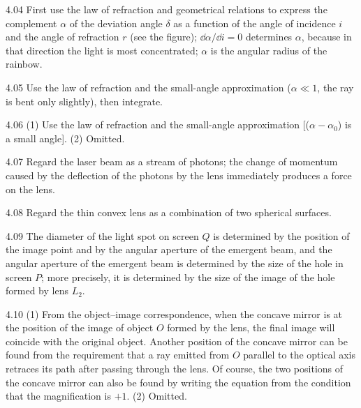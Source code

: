 \begin{hint}{4.04}
First use the law of refraction and geometrical relations to express the complement $\alpha$ of the deviation angle $\delta$ as a function of the angle of incidence $i$ and the angle of refraction $r$ (see the figure); $\dd\alpha/\dd i=0$ determines $\alpha$, because in that direction the light is most concentrated; $\alpha$ is the angular radius of the rainbow.
\end{hint}

\begin{hint}{4.05}
Use the law of refraction and the small-angle approximation ($\alpha\ll1$, the ray is bent only slightly), then integrate.
\end{hint}

\begin{hint}{4.06}
(1) Use the law of refraction and the small-angle approximation [($\alpha-\alpha_0$) is a small angle]. (2) Omitted.
\end{hint}

\begin{hint}{4.07}
Regard the laser beam as a stream of photons; the change of momentum caused by the deflection of the photons by the lens immediately produces a force on the lens.
\end{hint}

\begin{hint}{4.08}
Regard the thin convex lens as a combination of two spherical surfaces.
\end{hint}

\begin{hint}{4.09}
The diameter of the light spot on screen $Q$ is determined by the position of the image point and by the angular aperture of the emergent beam, and the angular aperture of the emergent beam is determined by the size of the hole in screen $P$; more precisely, it is determined by the size of the image of the hole formed by lens $L_2$.
\end{hint}

\begin{hint}{4.10}
(1) From the object--image correspondence, when the concave mirror is at the position of the image of object $O$ formed by the lens, the final image will coincide with the original object. Another position of the concave mirror can be found from the requirement that a ray emitted from $O$ parallel to the optical axis retraces its path after passing through the lens. Of course, the two positions of the concave mirror can also be found by writing the equation from the condition that the magnification is $+1$. (2) Omitted.
\end{hint}

